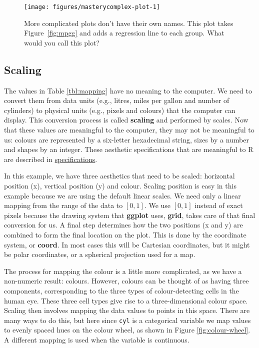 \begin{figure}

{\centering \texttt{[image: figures/masterycomplex-plot-1]} 

}

\caption{More complicated plots don't have their own names. This plot takes Figure~\ref{fig:mpgg} and adds a regression line to each group. What would you call this plot?\label{fig:complex-plot}}
\end{figure}

\subsection{Scaling}

The values in Table \ref{tbl:mapping} have no meaning to the computer.
We need to convert them from data units (e.g., litres, miles per gallon
and number of cylinders) to physical units (e.g., pixels and colours)
that the computer can display. This conversion process is called
\textbf{scaling} and performed by scales. Now that these values are
meaningful to the computer, they may not be meaningful to us: colours
are represented by a six-letter hexadecimal string, sizes by a number
and shapes by an integer. These aesthetic specifications that are
meaningful to R are described in
\hyperref[cha:specifications]{specifications}.

In this example, we have three aesthetics that need to be scaled:
horizontal position (x), vertical position (y) and colour. Scaling
position is easy in this example because we are using the default linear
scales. We need only a linear mapping from the range of the data to
\([0, 1]\). We use \([0, 1]\) instead of exact pixels because the
drawing system that \textbf{ggplot} uses, \textbf{grid}, takes care of
that final conversion for us. A final step determines how the two
positions (x and y) are combined to form the final location on the plot.
This is done by the coordinate system, or \textbf{coord}. In most cases
this will be Cartesian coordinates, but it might be polar coordinates,
or a spherical projection used for a map.

The process for mapping the colour is a little more complicated, as we
have a non-numeric result: colours. However, colours can be thought of
as having three components, corresponding to the three types of
colour-detecting cells in the human eye. These three cell types give
rise to a three-dimensional colour space. Scaling then involves mapping
the data values to points in this space. There are many ways to do this,
but here since \texttt{cyl} is a categorical variable we map values to
evenly spaced hues on the colour wheel, as shown in Figure
\ref{fig:colour-wheel}. A different mapping is used when the variable is
continuous. 

